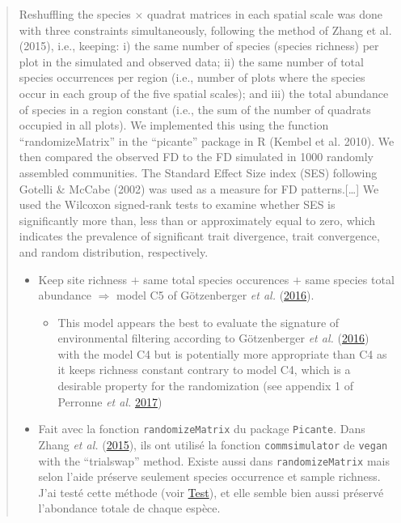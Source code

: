 \documentclass[]{article}
\providecommand{\tightlist}{%
  \setlength{\itemsep}{0pt}\setlength{\parskip}{0pt}}
\begin{document}
\begin{quote}
Reshuffling the species × quadrat matrices in each spatial scale was
done with three constraints simultaneously, following the method of
Zhang et al. (2015), i.e., keeping: i) the same number of species
(species richness) per plot in the simulated and observed data; ii) the
same number of total species occurrences per region (i.e., number of
plots where the species occur in each group of the five spatial scales);
and iii) the total abundance of species in a region constant (i.e., the
sum of the number of quadrats occupied in all plots). We implemented
this using the function ``randomizeMatrix'' in the ``picante'' package
in R (Kembel et al. 2010). We then compared the observed FD to the FD
simulated in 1000 randomly assembled communities. The Standard Effect
Size index (SES) following Gotelli \& McCabe (2002) was used as a
measure for FD patterns.{[}\ldots{}{]} We used the Wilcoxon signed-rank
tests to examine whether SES is significantly more than, less than or
approximately equal to zero, which indicates the prevalence of
significant trait divergence, trait convergence, and random
distribution, respectively.

\begin{itemize}
\tightlist
\item
  Keep site richness \(+\) same total species occurences \(+\) same
  species total abundance \(\Rightarrow\) model C5 of Götzenberger
  \emph{et al.}
  (\protect\hyperlink{ref-gotzenberger2016randomizations}{2016}).

  \begin{itemize}
  \tightlist
  \item
    This model appears the best to evaluate the signature of
    environmental filtering according to Götzenberger \emph{et al.}
    (\protect\hyperlink{ref-gotzenberger2016randomizations}{2016}) with
    the model C4 but is potentially more appropriate than C4 as it keeps
    richness constant contrary to model C4, which is a desirable
    property for the randomization (see appendix 1 of Perronne \emph{et
    al.} \protect\hyperlink{ref-perronne2017}{2017})
  \end{itemize}
\item
  Fait avec la fonction \texttt{randomizeMatrix} du package
  \texttt{Picante}. Dans Zhang \emph{et al.}
  (\protect\hyperlink{ref-zhang2015}{2015}), ils ont utilisé la fonction
  \texttt{commsimulator} de \texttt{vegan} with the ``trialswap''
  method. Existe aussi dans \texttt{randomizeMatrix} mais selon l'aide
  préserve seulement species occurrence et sample richness. J'ai testé
  cette méthode (voir \protect\hyperlink{test}{Test}), et elle semble
  bien aussi préservé l'abondance totale de chaque espèce.
\end{itemize}
\end{quote}
\end{document}
